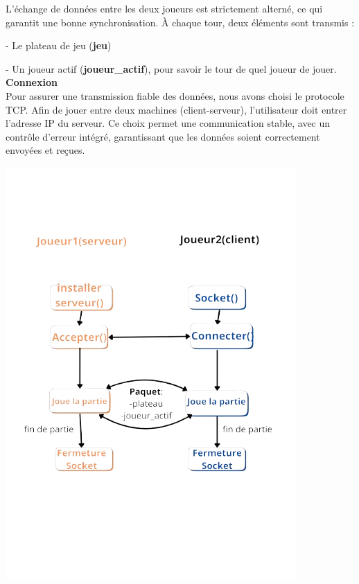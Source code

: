\documentclass[12pt, a4paper, oneside]{article}
\begin{document}
            L’échange de données entre les deux joueurs est strictement alterné, ce qui garantit une bonne synchronisation. À chaque tour, deux éléments sont transmis :
        
            - Le plateau de jeu (\textbf{jeu})
        
            - Un joueur actif  (\textbf{joueur\_actif}), pour savoir le tour de quel joueur de jouer. \\
            

            \textbf{Connexion} \\
        
            Pour assurer une transmission fiable des données, nous avons choisi le protocole TCP. Afin de jouer entre deux machines (client-serveur), l’utilisateur doit entrer l’adresse IP du serveur. Ce choix permet une communication stable, avec un contrôle d’erreur intégré, garantissant que les données soient correctement envoyées et reçues.
            
            \begin{center}
                \includegraphics[scale=0.7]{schema_reseau.png}
            \end{center}
\end{document}
